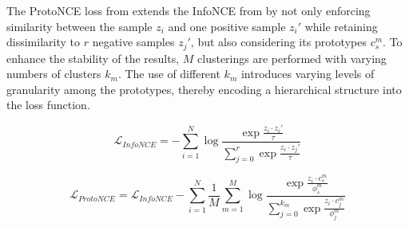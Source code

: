 The ProtoNCE loss from  extends the InfoNCE from  
by not only enforcing similarity between the sample $z_i$ and 
one positive sample $z_i'$ while retaining dissimilarity to $r$ negative samples $z_j'$, 
but also considering its prototypes $c^m_s$. 
To enhance the stability of the results, $M$ clusterings are performed with varying numbers of clusters $k_m$. 
The use of different $k_m$ introduces varying levels of granularity among the prototypes, 
thereby encoding a hierarchical structure into the loss function.

\begin{equation}
    \mathcal{L}_{InfoNCE}= - \sum_{i=1}^{N}\log\frac{\exp \frac{z_i\cdot z_i'}{\tau}}{\sum_{j=0}^{r}\exp \frac{z_i\cdot z_j'}{\tau}}
    \label{eq:InfoNCE}
\end{equation}

\begin{equation}
    \mathcal{L}_{ProtoNCE}=\mathcal{L}_{InfoNCE} - \sum_{i=1}^{N} \frac{1}{M} \sum_{m=1}^{M} \log\frac{\exp \frac{z_i\cdot c_s^m}{\phi^m_s}}{\sum_{j=0}^{k_m}\exp \frac{z_i\cdot c_j^m}{\phi^m_j}}
    \label{eq:ProtoNCE}
\end{equation}


